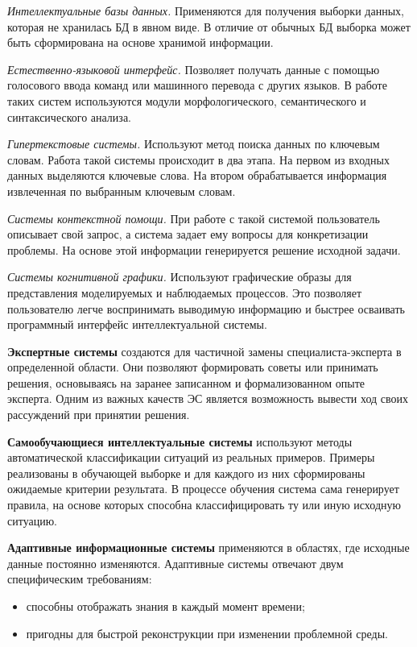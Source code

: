 \textit{Интеллектуальные базы данных.} Применяются для получения выборки данных, которая не хранилась БД в явном виде. В отличие от обычных БД выборка может быть сформирована на основе хранимой информации.

\textit{Естественно-языковой интерфейс.} Позволяет получать данные с помощью голосового ввода команд или машинного перевода с других языков. В работе таких систем используются модули морфологического, семантического и синтаксического анализа.

\textit{Гипертекстовые системы.} Используют метод поиска данных по ключевым словам. Работа такой системы происходит в два этапа. На первом из входных данных выделяются ключевые слова. На втором  обрабатывается информация извлеченная по выбранным ключевым словам.

\textit{Системы контекстной помощи.} При работе с такой системой пользователь описывает свой запрос, а система задает ему вопросы для конкретизации проблемы. На основе этой информации генерируется решение исходной задачи.

\textit{Системы когнитивной графики.} Используют графические образы для представления моделируемых и наблюдаемых процессов. Это позволяет пользователю легче воспринимать выводимую информацию и быстрее осваивать программный интерфейс интеллектуальной системы.

\textbf{Экспертные системы} создаются для частичной замены специалиста-эксперта в определенной области. Они позволяют формировать советы или принимать решения, основываясь на заранее записанном и формализованном опыте эксперта. Одним из важных качеств ЭС является возможность вывести ход своих рассуждений при принятии решения. 

\textbf{Самообучающиеся интеллектуальные системы} используют методы автоматической классификации ситуаций из реальных примеров. Примеры реализованы в обучающей выборке и для каждого из них сформированы ожидаемые критерии результата. В процессе обучения система сама генерирует правила, на основе которых способна классифицировать ту или иную исходную ситуацию. 

\textbf{Адаптивные информационные системы} применяются в областях, где исходные данные постоянно изменяются. Адаптивные системы отвечают двум специфическим требованиям:

\begin{itemize}
	\item способны отображать знания в каждый момент времени;
	\item пригодны для быстрой реконструкции при изменении проблемной среды.
\end{itemize}

